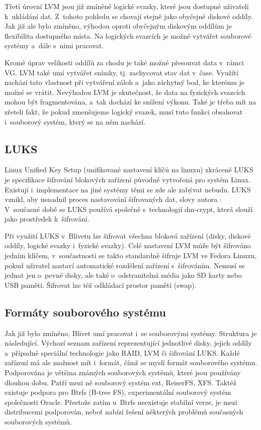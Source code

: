 \documentclass[color,table,oneside,nolot,nolof]{fithesis}
\begin{document}
	Třetí úrovní LVM jsou již zmíněné logické svazky, které jsou dostupné uživateli k~ukládání dat. Z~tohoto pohledu se chovají stejně jako obyčejné diskové oddíly. Jak již ale
	bylo zmíněno, výhodou oproti obyčejným diskovým oddílům je flexibilita dostupného místa. Na logických svazcích je možné vytvářet souborové systémy a~dále s~nimi pracovat.

	Kromě úprav velikosti oddílů za chodu je také možné přesouvat data v~rámci VG. LVM také umí vytvářet snímky, tj. zachycovat stav dat v~čase. Využítí nachází tato 
	vlastnost
	při vytváření záloh a~jako záchytný bod, ke kterému je možné se vrátit. Nevýhodou LVM je skutečnost, že data na fyzických svazcích mohou být fragmentována, a~tak
	dochází ke snížení výkonu. Také je třeba mít na zřeteli fakt, že pokud zmenšujeme logický svazek, musí tuto funkci obsahovat i~souborový systém, který se na něm nachází.

\subsection{LUKS}
	Linux Unified Key Setup (unifikované nastavení klíčů na linuxu) zkráceně LUKS je specifikace šifrování blokových zařízení původně vytvořená pro systém Linux. Existují i~implementace na jiné 
	systémy
	těmi se zde ale zabývat nebudu. LUKS vznikl, aby usnadnil proces nastavování šifrovaných dat, slovy autora : \cite{on-disk-format} V~současné době se LUKS používá společně s~technologií dm-crypt, která slouží jako prostředek k~šifrování.

	Při využití LUKS v~Blivetu lze šifrovat všechna bloková zařízení (disky, diskové oddíly, logické svazky i~fyzické svazky). Celé nastavení LVM může být šifrováno jedním klíčem, v~součastnosti se takto 
	standardně šifruje LVM ve Fedora Linuxu, pokud uživatel nastaví automatické rozdělení zařízení s~šifrováním. Nemusí se jednat jen o~pevné disky, ale také o~odstranitelná média jako
	SD karty nebo USB paměti. Šifrovat lze též odkládací prostor paměti (swap).

\subsection{Formáty souborového systému}
  Jak již bylo zmíněno, Blivet umí pracovat i~se souborovými systémy. Struktura je následující. Výchozí seznam zařízení reprezentující jednotlivé disky, jejich oddíly a~případně
	speciální technologie jako RAID, LVM či šifrování LUKS. Každé zařízení má ale možnost mít i~formát, čímž se myslí formát souborového systému. Podporována je většina známých 
	souborových
	systémů, které jsou používány dlouhou dobu. Patří mezi ně souborový systém ext, ReiserFS, XFS. Taktéž existuje podpora pro Btrfs (B-tree FS), experimentální souborový systém 
	společnosti Oracle. Přestože zatím u~Btrfs neexistuje stabilní verze, je mezi distribucemi podporován, neboť nabízí řešení některých problémů současných souborových systémů.
\end{document}

